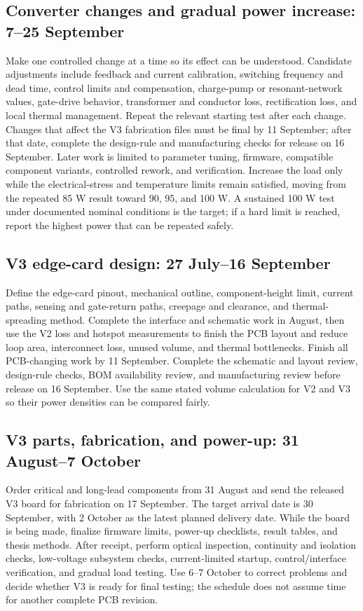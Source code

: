 \documentclass[12pt,a4paper]{report}
\begin{document}
\subsection*{Converter changes and gradual power increase: 7--25 September}
    Make one controlled change at a time so its effect can be understood. Candidate adjustments include feedback and current calibration, switching frequency and dead time, control limits and compensation, charge-pump or resonant-network values, gate-drive behavior, transformer and conductor loss, rectification loss, and local thermal management. Repeat the relevant starting test after each change. Changes that affect the V3 fabrication files must be final by 11 September; after that date, complete the design-rule and manufacturing checks for release on 16 September. Later work is limited to parameter tuning, firmware, compatible component variants, controlled rework, and verification. Increase the load only while the electrical-stress and temperature limits remain satisfied, moving from the repeated 85 W result toward 90, 95, and 100 W. A sustained 100 W test under documented nominal conditions is the target; if a hard limit is reached, report the highest power that can be repeated safely.

\subsection*{V3 edge-card design: 27 July--16 September}
    Define the edge-card pinout, mechanical outline, component-height limit, current paths, sensing and gate-return paths, creepage and clearance, and thermal-spreading method. Complete the interface and schematic work in August, then use the V2 loss and hotspot measurements to finish the PCB layout and reduce loop area, interconnect loss, unused volume, and thermal bottlenecks. Finish all PCB-changing work by 11 September. Complete the schematic and layout review, design-rule checks, BOM availability review, and manufacturing review before release on 16 September. Use the same stated volume calculation for V2 and V3 so their power densities can be compared fairly.

\subsection*{V3 parts, fabrication, and power-up: 31 August--7 October}
    Order critical and long-lead components from 31 August and send the released V3 board for fabrication on 17 September. The target arrival date is 30 September, with 2 October as the latest planned delivery date. While the board is being made, finalize firmware limits, power-up checklists, result tables, and thesis methods. After receipt, perform optical inspection, continuity and isolation checks, low-voltage subsystem checks, current-limited startup, control/interface verification, and gradual load testing. Use 6--7 October to correct problems and decide whether V3 is ready for final testing; the schedule does not assume time for another complete PCB revision.
\end{document}
